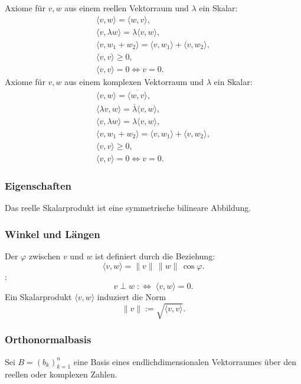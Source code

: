 Axiome für $v,w$ aus einem reellen Vektorraum und $\lambda$ ein Skalar:
\begin{gather}
\langle v,w\rangle = \langle w,v\rangle,\\
\langle v,\lambda w\rangle = \lambda\langle v,w\rangle,\\
\langle v,w_1+w_2\rangle = \langle v,w_1\rangle +\langle v,w_2\rangle,\\
\langle v,v\rangle\ge 0,\\
\langle v,v\rangle=0 \iff v=0.
\end{gather}
Axiome für $v,w$ aus einem komplexen Vektorraum und $\lambda$ ein Skalar:
\begin{gather}
\langle v,w\rangle = \overline{\langle w,v\rangle},\\
\langle \lambda v,w\rangle = \overline{\lambda}\langle v,w\rangle,\\
\langle v,\lambda w\rangle = \lambda\langle v,w\rangle,\\
\langle v,w_1+w_2\rangle = \langle v,w_1\rangle +\langle v,w_2\rangle,\\
\langle v,v\rangle\ge 0,\\
\langle v,v\rangle=0 \iff v=0.
\end{gather}

\subsubsection{Eigenschaften}
Das reelle Skalarprodukt ist eine symmetrische bilineare Abbildung.

\subsubsection{Winkel und Längen}
{}
Der  $\varphi$ zwischen $v$ und $w$
ist definiert durch die Beziehung:
\begin{equation}
\langle v,w\rangle = \|v\|\,\|w\|\,\cos\varphi.
\end{equation}
{}
:
\begin{equation}
v\perp w \;:\Longleftrightarrow\; \langle v,w\rangle=0.
\end{equation}
Ein Skalarprodukt $\langle v,w\rangle$ induziert die Norm
\begin{equation}
\|v\| := \sqrt{\langle v,v\rangle}.
\end{equation}

\subsubsection{Orthonormalbasis}\label{sec:ONB}
Sei $B=(b_k)_{k=1}^n$ eine Basis eines endlichdimensionalen
Vektorraumes über den reellen oder komplexen Zahlen.

